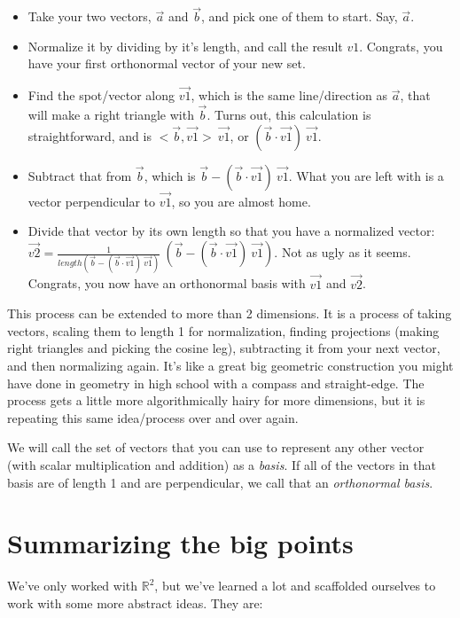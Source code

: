 \documentclass[
]{book}
\providecommand{\tightlist}{%
  \setlength{\itemsep}{0pt}\setlength{\parskip}{0pt}}
\begin{document}
\begin{itemize}
\tightlist
\item
  Take your two vectors, \(\vec{a}\) and \(\vec{b}\), and pick one of them to start. Say, \(\vec{a}\).
\item
  Normalize it by dividing by it's length, and call the result \(v1\). Congrats, you have your first orthonormal vector of your new set.
\item
  Find the spot/vector along \(\vec{v1}\), which is the same line/direction as \(\vec{a}\), that will make a right triangle with \(\vec{b}\). Turns out, this calculation is straightforward, and is \(<\vec{b},\vec{v1}>\ \vec{v1}\), or \((\vec{b}\cdot\vec{v1})\ \vec{v1}\).
\item
  Subtract that from \(\vec{b}\), which is \(\vec{b} - (\vec{b}\cdot\vec{v1})\ \vec{v1}\). What you are left with is a vector perpendicular to \(\vec{v1}\), so you are almost home.
\item
  Divide that vector by its own length so that you have a normalized vector: \(\vec{v2} = \frac{1}{length(\vec{b} - (\vec{b}\cdot\vec{v1})\ \vec{v1})}\ (\vec{b} - (\vec{b}\cdot\vec{v1})\ \vec{v1})\). Not as ugly as it seems. Congrats, you now have an orthonormal basis with \(\vec{v1}\) and \(\vec{v2}\).
\end{itemize}

This process can be extended to more than 2 dimensions. It is a process of taking vectors, scaling them to length 1 for normalization, finding projections (making right triangles and picking the cosine leg), subtracting it from your next vector, and then normalizing again. It's like a great big geometric construction you might have done in geometry in high school with a compass and straight-edge. The process gets a little more algorithmically hairy for more dimensions, but it is repeating this same idea/process over and over again.

We will call the set of vectors that you can use to represent any other vector (with scalar multiplication and addition) as a \emph{basis}. If all of the vectors in that basis are of length 1 and are perpendicular, we call that an \emph{orthonormal basis}.

\hypertarget{summarizing-the-big-points-1}{%
\section{Summarizing the big points}\label{summarizing-the-big-points-1}}

We've only worked with \(\mathbb{R}^2\), but we've learned a lot and scaffolded ourselves to work with some more abstract ideas. They are:
\end{document}
